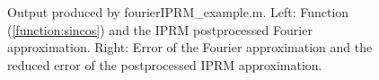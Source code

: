 \documentclass[12pt]{article}
\begin{document}
\begin{figure}[tbh]
 \caption{Output produced by fourierIPRM\_example.m. Left: Function (\ref{function:sincos}) and the IPRM postprocessed Fourier approximation.  Right: Error of the Fourier approximation and the reduced error of the postprocessed IPRM approximation.
          } \label{fig:fourierIprmExample}
 \end{figure}
\end{document}
